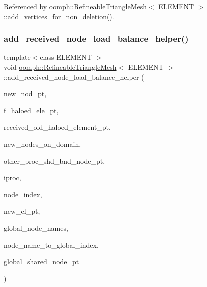 Referenced by oomph\+::\+Refineable\+Triangle\+Mesh$<$ E\+L\+E\+M\+E\+N\+T $>$\+::add\+\_\+vertices\+\_\+for\+\_\+non\+\_\+deletion().

\mbox{\label{classoomph_1_1RefineableTriangleMesh_a2bdd1a67bb1c83fc9d3c7b1438dc61c4}} 
\subsubsection{\texorpdfstring{add\+\_\+received\+\_\+node\+\_\+load\+\_\+balance\+\_\+helper()}{add\_received\_node\_load\_balance\_helper()}}
{\footnotesize\ttfamily template$<$class E\+L\+E\+M\+E\+NT $>$ \\
void \hyperlink{classoomph_1_1RefineableTriangleMesh}{oomph\+::\+Refineable\+Triangle\+Mesh}$<$ E\+L\+E\+M\+E\+NT $>$\+::add\+\_\+received\+\_\+node\+\_\+load\+\_\+balance\+\_\+helper (\begin{DoxyParamCaption}\item[{Node $\ast$\&}]{new\+\_\+nod\+\_\+pt,  }\item[{Vector$<$ Vector$<$ Finite\+Element $\ast$$>$ $>$ \&}]{f\+\_\+haloed\+\_\+ele\+\_\+pt,  }\item[{Vector$<$ Vector$<$ std\+::map$<$ unsigned, Finite\+Element $\ast$$>$ $>$ $>$ \&}]{received\+\_\+old\+\_\+haloed\+\_\+element\+\_\+pt,  }\item[{Vector$<$ Node $\ast$$>$ \&}]{new\+\_\+nodes\+\_\+on\+\_\+domain,  }\item[{Vector$<$ Vector$<$ Vector$<$ std\+::map$<$ unsigned, Node $\ast$$>$ $>$ $>$ $>$ \&}]{other\+\_\+proc\+\_\+shd\+\_\+bnd\+\_\+node\+\_\+pt,  }\item[{unsigned \&}]{iproc,  }\item[{unsigned \&}]{node\+\_\+index,  }\item[{Finite\+Element $\ast$const \&}]{new\+\_\+el\+\_\+pt,  }\item[{Vector$<$ Vector$<$ Vector$<$ unsigned $>$ $>$ $>$ \&}]{global\+\_\+node\+\_\+names,  }\item[{std\+::map$<$ Vector$<$ unsigned $>$, unsigned $>$ \&}]{node\+\_\+name\+\_\+to\+\_\+global\+\_\+index,  }\item[{Vector$<$ Node $\ast$$>$ \&}]{global\+\_\+shared\+\_\+node\+\_\+pt }\end{DoxyParamCaption})\hspace{0.3cm}{\ttfamily [protected]}}



